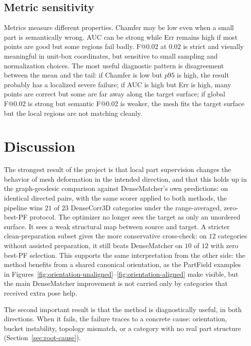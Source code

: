 \documentclass{article}
\makeatletter
\newcommand{\Fscore}{F@0.02}
\makeatother
\begin{document}
\subsection{Metric sensitivity}

Metrics measure different properties. Chamfer may be low even when a small part is semantically
wrong. AUC can be strong while Err remains high if most points are good but some regions fail
badly. \Fscore{} at $0.02$ is strict and visually meaningful in unit-box coordinates, but sensitive
to small sampling and normalization choices. The most useful diagnostic pattern is disagreement
between the mean and the tail: if Chamfer is low but $p95$ is high, the result probably has a
localized severe failure; if AUC is high but Err is high, many points are correct but some are far
away along the target surface; if global \Fscore{} is strong but semantic \Fscore{} is weaker, the
mesh fits the target surface but the local regions are not matching cleanly.

\section{Discussion}

The strongest result of the project is that local part supervision changes the behavior of mesh
deformation in the intended direction, and that this holds up in the graph-geodesic comparison
against DenseMatcher's own predictions: on identical directed pairs, with the same scorer applied
to both methods, the pipeline wins $21$ of $23$ DenseCorr3D categories under the range-averaged,
zero-best-PF protocol.
The optimizer no longer sees the target as only an unordered surface. It sees a weak structural map
between source and target. A stricter clean-preparation subset gives the more conservative
cross-check: on $12$ categories without assisted preparation, it still beats DenseMatcher on $10$
of $12$ with zero best-PF selection. This supports the same
interpretation from the other side: the method benefits from a shared canonical orientation, as the
PartField examples in Figures~\ref{fig:orientation-unaligned}--\ref{fig:orientation-aligned} make
visible, but the main DenseMatcher improvement is not carried only by categories that received
extra pose help.

The second important result is that the method is diagnostically useful, in both directions. When
it fails, the failure traces to a concrete cause: orientation, bucket instability, topology
mismatch, or a category with no real part structure (Section~\ref{sec:root-cause}).
\end{document}
